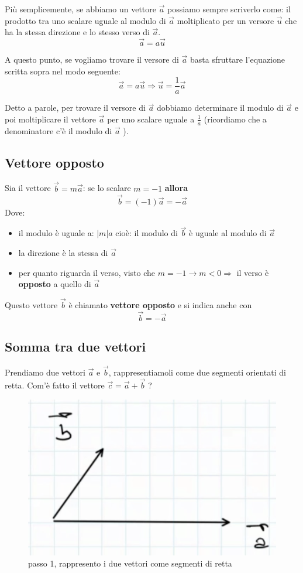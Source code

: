 \documentclass[a4paper]{book}
\begin{document}
Più semplicemente, se abbiamo un vettore $ \overrightarrow{a} $ possiamo sempre scriverlo come: il prodotto tra uno scalare uguale al modulo di $ \overrightarrow{a} $ moltiplicato per un versore $ \overrightarrow{u} $ che ha la stessa direzione e lo stesso verso di $\overrightarrow{a} $.
$$ \overrightarrow{a} = a \overrightarrow{u} $$

A questo punto, se vogliamo trovare il versore di $\overrightarrow{a}$ basta sfruttare l'equazione scritta sopra nel modo seguente:
$$ \overrightarrow{a} = a \overrightarrow{u} \Rightarrow \overrightarrow{u} = \frac{1}{a} \overrightarrow{a} $$

Detto a parole, per trovare il versore di $ \overrightarrow{a} $ dobbiamo determinare il modulo di $ \overrightarrow{a} $ e poi moltiplicare il vettore $ \overrightarrow{a} $ per uno scalare uguale a $ \frac{1}{a} $ (ricordiamo che a denominatore c'è il modulo di $ \overrightarrow{a} $ ).

\subsection{Vettore opposto}
Sia il vettore $\overrightarrow{b} = m\overrightarrow{a} $: se lo scalare $ m = - 1 $ \textbf{allora}
$$ \overrightarrow{b} = (-1) \overrightarrow{a} = -  \overrightarrow{a} $$
Dove:
\begin{itemize}
	\item il modulo è uguale a: $\left | m \right | a $ cioè: il modulo di $ \overrightarrow{b} $ è uguale al modulo di $ \overrightarrow{a} $
	\item la direzione è la stessa di $ \overrightarrow{a}$
	\item per quanto riguarda il verso, visto che $ m = -1 \rightarrow m < 0 \Rightarrow$ il verso è \textbf{opposto} a quello di $ \overrightarrow{a} $
\end{itemize}

Questo vettore $\overrightarrow{b}$ è chiamato \textbf{vettore opposto} e si indica anche con
$$ \overrightarrow{b} = - \overrightarrow{a} $$
\newpage
\subsection{Somma tra due vettori}
Prendiamo due vettori $\overrightarrow{a}$ e $ \overrightarrow{b} $, rappresentiamoli come due segmenti orientati di retta. Com'è fatto il vettore $\overrightarrow{c} = \overrightarrow{a} + \overrightarrow{b} $ ?
\begin{figure}[h]
\begin{center}
\includegraphics[width = 0.5 \textwidth]{somma1}
\caption{passo 1, rappresento i due vettori come segmenti di retta}
\label{fig:somma1}
\end{center}
\end{figure}
\end{document}

